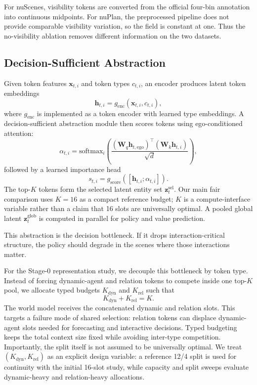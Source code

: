 \documentclass[10pt,journal,compsoc]{IEEEtran}
\begin{document}
For nuScenes, visibility tokens are converted from the official four-bin annotation into continuous midpoints. For nuPlan, the preprocessed pipeline does not provide comparable visibility variation, so the field is constant at one. Thus the no-visibility ablation removes different information on the two datasets.

\subsection{Decision-Sufficient Abstraction}
Given token features $\mathbf{x}_{t,i}$ and token types $c_{t,i}$, an encoder produces latent token embeddings
\begin{equation}
\mathbf{h}_{t,i} = g_{\mathrm{enc}}(\mathbf{x}_{t,i}, c_{t,i}),
\label{eq:encoder}
\end{equation}
where $g_{\mathrm{enc}}$ is implemented as a token encoder with learned type embeddings. A decision-sufficient abstraction module then scores tokens using ego-conditioned attention:
\begin{equation}
\alpha_{t,i} = \mathrm{softmax}_i\left(\frac{(\mathbf{W}_q \mathbf{h}_{t,\mathrm{ego}})^\top(\mathbf{W}_k \mathbf{h}_{t,i})}{\sqrt{d}}\right),
\label{eq:attention}
\end{equation}
followed by a learned importance head
\begin{equation}
s_{t,i} = g_{\mathrm{score}}([\mathbf{h}_{t,i}; \alpha_{t,i}]).
\label{eq:score}
\end{equation}
The top-$K$ tokens form the selected latent entity set $\mathbf{z}^{\mathrm{sel}}_t$. Our main fair comparison uses $K=16$ as a compact reference budget; $K$ is a compute-interface variable rather than a claim that 16 slots are universally optimal. A pooled global latent $\mathbf{z}^{\mathrm{glob}}_t$ is computed in parallel for policy and value prediction.

This abstraction is the decision bottleneck. If it drops interaction-critical structure, the policy should degrade in the scenes where those interactions matter.

For the Stage-0 representation study, we decouple this bottleneck by token type. Instead of forcing dynamic-agent and relation tokens to compete inside one top-$K$ pool, we allocate typed budgets $K_{\mathrm{dyn}}$ and $K_{\mathrm{rel}}$ such that
\begin{equation}
K_{\mathrm{dyn}} + K_{\mathrm{rel}} = K.
\label{eq:typedbudget}
\end{equation}
The world model receives the concatenated dynamic and relation slots. This targets a failure mode of shared selection: relation tokens can displace dynamic-agent slots needed for forecasting and interactive decisions. Typed budgeting keeps the total context size fixed while avoiding inter-type competition. Importantly, the split itself is not assumed to be universally optimal. We treat $(K_{\mathrm{dyn}}, K_{\mathrm{rel}})$ as an explicit design variable: a reference 12/4 split is used for continuity with the initial 16-slot study, while capacity and split sweeps evaluate dynamic-heavy and relation-heavy allocations.
\end{document}
